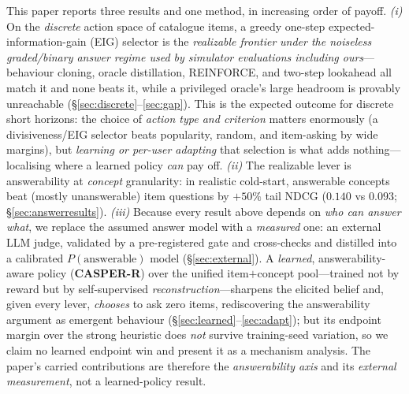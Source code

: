 \documentclass[11pt]{article}
\begin{document}
This paper reports three results and one method, in increasing order of payoff. \emph{(i)} On the
\emph{discrete} action space of catalogue items, a greedy one-step expected-information-gain (EIG)
selector is the \emph{realizable frontier} \emph{under the noiseless graded/binary answer regime used by simulator
evaluations including ours}---behaviour cloning, oracle distillation, REINFORCE, and
two-step lookahead all match it and none beats it, while a privileged oracle's large headroom is
provably unreachable (\S\ref{sec:discrete}--\ref{sec:gap}). This is the expected outcome for discrete
short horizons: the choice of \emph{action type and criterion} matters enormously (a divisiveness/EIG
selector beats popularity, random, and item-asking by wide margins), but \emph{learning or per-user
adapting} that selection is what adds nothing---localising where a learned policy \emph{can} pay off. \emph{(ii)} The realizable
lever is answerability at \emph{concept} granularity: in realistic cold-start, answerable concepts beat
(mostly unanswerable) item questions by $+50\%$ tail NDCG ($0.140$ vs $0.093$; \S\ref{sec:answerresults}). \emph{(iii)}
Because every result above depends on \emph{who can answer what}, we replace the assumed answer model with a
\emph{measured} one: an external LLM judge, validated by a pre-registered gate and cross-checks and distilled into a
calibrated $P(\text{answerable})$ model (\S\ref{sec:external}). A \emph{learned}, answerability-aware policy
(\textbf{CASPER-R}) over the unified item$+$concept pool---trained not by reward but by self-supervised
\emph{reconstruction}---sharpens the elicited belief and, given every lever, \emph{chooses} to ask zero items,
rediscovering the answerability argument as emergent behaviour (\S\ref{sec:learned}--\ref{sec:adapt}); but its endpoint
margin over the strong heuristic does \emph{not} survive training-seed variation, so we claim no learned endpoint win and
present it as a mechanism analysis. The paper's carried contributions are therefore the \emph{answerability axis} and its
\emph{external measurement}, not a learned-policy result.
\end{document}
